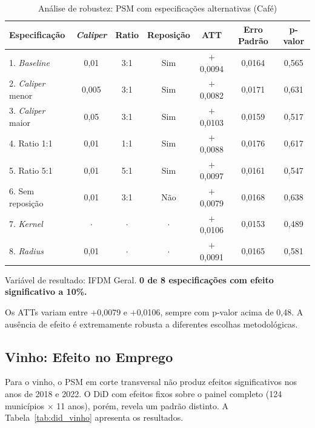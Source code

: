 \documentclass[12pt, a4paper]{article}
\begin{document}
\begin{table}[htbp]
\centering
\caption{Análise de robustez: PSM com especificações alternativas (Café)}
\label{tab:robustez_cafe}
\begin{threeparttable}
\begin{tabular}{lcccccc}
\toprule
Especificação & \textit{Caliper} & Ratio & Reposição & ATT & Erro Padrão & p-valor \\
\midrule
1. \textit{Baseline}      & 0,01  & 3:1   & Sim & $+$0,0094 & 0,0164 & 0,565 \\
2. \textit{Caliper} menor & 0,005 & 3:1   & Sim & $+$0,0082 & 0,0171 & 0,631 \\
3. \textit{Caliper} maior & 0,05  & 3:1   & Sim & $+$0,0103 & 0,0159 & 0,517 \\
4. Ratio 1:1              & 0,01  & 1:1   & Sim & $+$0,0088 & 0,0176 & 0,617 \\
5. Ratio 5:1              & 0,01  & 5:1   & Sim & $+$0,0097 & 0,0161 & 0,547 \\
6. Sem reposição          & 0,01  & 3:1   & Não & $+$0,0079 & 0,0168 & 0,638 \\
7. \textit{Kernel}        & $\cdot$ & $\cdot$ & $\cdot$ & $+$0,0106 & 0,0153 & 0,489 \\
8. \textit{Radius}        & 0,01  & $\cdot$ & $\cdot$ & $+$0,0091 & 0,0165 & 0,581 \\
\bottomrule
\end{tabular}
\begin{tablenotes}
\small
\item Variável de resultado: IFDM Geral. \textbf{0 de 8 especificações com efeito significativo a 10\%.}
\end{tablenotes}
\end{threeparttable}
\end{table}

Os ATTs variam entre $+$0,0079 e $+$0,0106, sempre com p-valor acima de 0,48. A ausência de efeito é extremamente robusta a diferentes escolhas metodológicas.

\subsection{Vinho: Efeito no Emprego}

Para o vinho, o PSM em corte transversal não produz efeitos significativos nos anos de 2018 e 2022. O DiD com efeitos fixos sobre o painel completo (124 municípios $\times$ 11 anos), porém, revela um padrão distinto. A Tabela~\ref{tab:did_vinho} apresenta os resultados.
\end{document}
